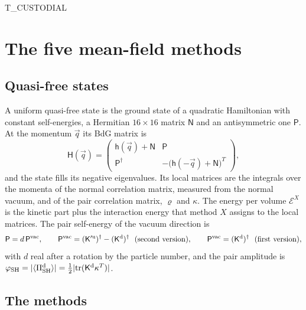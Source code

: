 \documentclass[aps,prd,onecolumn,superscriptaddress,nofootinbib,floatfix,longbibliography]{revtex4-2}
\newcommand{\SH}{{\rm SH}}
\newcommand{\tr}{\mathrm{tr}}
\begin{document}
{{T_CUSTODIAL}}

\section{The five mean-field methods}
\label{sec:methods}

\subsection{Quasi-free states}

A uniform quasi-free state is the ground state of a quadratic Hamiltonian with constant self-energies, a Hermitian
$16\times16$ matrix $\mathsf N$ and an antisymmetric one $\mathsf P$. At the momentum $\vec q$ its BdG matrix is
\begin{equation}
\mathsf H(\vec q)=\begin{pmatrix}\mathsf h(\vec q)+\mathsf N&\mathsf P\\\mathsf P^\dagger&-\big(\mathsf h(-\vec q)+\mathsf N\big)^T\end{pmatrix},
\label{eq:BdG}
\end{equation}
and the state fills its negative eigenvalues. Its local matrices are the integrals over the momenta of the normal
correlation matrix, measured from the normal vacuum, and of the pair correlation matrix, $\varrho$ and $\kappa$. The energy
per volume $\mathcal E^X$ is the kinetic part plus the interaction energy that method $X$ assigns to the local matrices.
The pair self-energy of the vacuum direction is
\begin{equation}
\mathsf P=d\,\mathsf P^{\rm vac},\qquad \mathsf P^{\rm vac}=(\mathsf K'^{\rm u})^\dagger-(\mathsf K^{\rm d})^\dagger\ \ \text{(second version)},\qquad
\mathsf P^{\rm vac}=(\mathsf K^{\rm d})^\dagger\ \ \text{(first version)},
\label{eq:Pvac}
\end{equation}
with $d$ real after a rotation by the particle number, and the pair amplitude is
$\varphi_\SH=|\langle\Pi^{\rm d}_\SH\rangle|=\frac12|\tr(\mathsf K^{\rm d}\kappa^T)|$.

\subsection{The methods}
\end{document}
